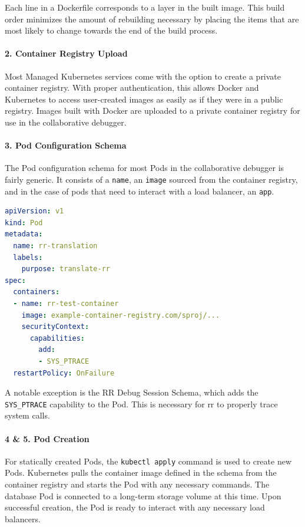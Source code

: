 \documentclass[12pt]{article}
\begin{document}
Each line in a Dockerfile corresponds to a layer in the built image.
This build order minimizes the amount of rebuilding necessary by
placing the items that are most likely to change towards the end of
the build process.

\paragraph{2. Container Registry Upload}

Most Managed Kubernetes services come with the option to create a
private container registry.  With proper authentication, this allows
Docker and Kubernetes to access user-created images as easily as if
they were in a public registry.  Images built with Docker are uploaded
to a private container registry for use in the collaborative debugger.

\paragraph{3. Pod Configuration Schema} \label{podschema}

The Pod configuration schema for most Pods in the collaborative
debugger is fairly generic.  It consists of a \lstinline{name}, an
\lstinline{image} sourced from the container registry, and in the case
of pods that need to interact with a load balancer, an
\lstinline{app}.

\begin{lstlisting}[language=YAML,basicstyle=\linespread{0.5}\ttfamily,caption={RR Debug Session Schema},captionpos=b]
apiVersion: v1
kind: Pod
metadata:
  name: rr-translation
  labels:
    purpose: translate-rr
spec:
  containers:
  - name: rr-test-container
    image: example-container-registry.com/sproj/...
    securityContext:
      capabilities:
        add:
        - SYS_PTRACE
  restartPolicy: OnFailure
\end{lstlisting}

A notable exception is the RR Debug Session Schema, which adds the
\lstinline{SYS_PTRACE} capability to the Pod.  This is necessary for
rr to properly trace system calls.

\paragraph{4 \& 5. Pod Creation}

For statically created Pods, the \lstinline{kubectl apply} command is
used to create new Pods.  Kubernetes pulls the container image defined
in the schema from the container registry and starts the Pod with any
necessary commands.  The database Pod is connected to a long-term
storage volume at this time.  Upon successful creation, the Pod is
ready to interact with any necessary load balancers.
\end{document}
